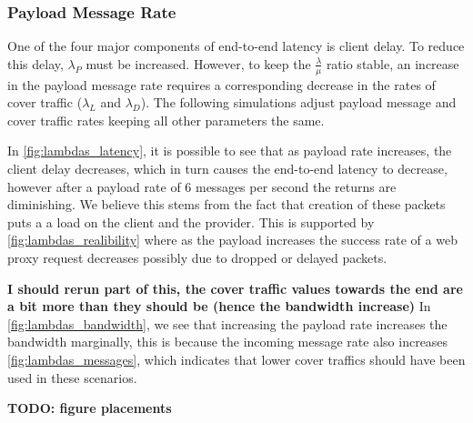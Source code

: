 \documentclass[a4paper,11pt,oneside]{report}
\begin{document}
\subsubsection{Payload Message Rate}
One of the four major components of end-to-end latency is client delay. To reduce this delay, \(\lambda_P\) must be increased. However, to keep the \(\frac{\lambda}{\mu}\) ratio stable, an increase in the payload message rate requires a corresponding decrease in the rates of cover traffic (\(\lambda_L\) and \(\lambda_D\)). The following simulations adjust payload message and cover traffic rates keeping all other parameters the same.

In \autoref{fig:lambdas_latency}, it is possible to see that as payload rate increases, the client delay decreases, which in turn causes the end-to-end latency to decrease, however after a payload rate of 6 messages per second the returns are diminishing. We believe this stems from the fact that creation of these packets puts a a load on the client and the provider. This is supported by \autoref{fig:lambdas_realibility} where as the payload increases the success rate of a web proxy request decreases possibly due to dropped or delayed packets.

\textbf{I should rerun part of this, the cover traffic values towards the end are a bit more than they should be (hence the bandwidth increase)}
In \autoref{fig:lambdas_bandwidth}, we see that increasing the payload rate increases the bandwidth marginally, this is because the incoming message rate also increases \autoref{fig:lambdas_messages}, which indicates that lower cover traffics should have been used in these scenarios.

\textbf{TODO: figure placements}
\end{document}
